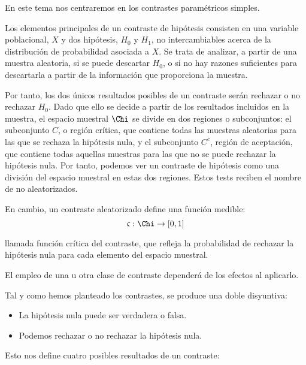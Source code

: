 En este tema nos centraremos en los contrastes param\'etricos simples.


Los elementos principales de un contraste de hip\'otesis consisten en una variable poblacional, $X$ y dos hip\'otesis, $H_0$ y $H_1$, no intercambiables acerca de la distribuci\'on de probabilidad asociada a $X$. Se trata de analizar, a partir de una muestra aleatoria, si se puede descartar $H_0$, o si no hay razones suficientes para descartarla a partir de la informaci\'on que proporciona la muestra.

Por tanto, los dos \'unicos resultados posibles de un contraste ser\'an rechazar o no rechazar $H_0$. Dado que ello se decide a partir de los resultados incluidos en la muestra, el espacio muestral $\Chi$ se divide en dos regiones o subconjuntos: el subconjunto $C$, o regi\'on cr\'itica, que contiene todas las muestras aleatorias para las que se rechaza la hip\'otesis nula, y el subconjunto $C^c$, regi\'on de aceptaci\'on, que contiene todas aquellas muestras para las que no se puede rechazar la hip\'otesis nula. Por tanto, podemos ver un contraste de hip\'otesis como una divisi\'on del espacio muestral en estas dos regiones. Estos tests reciben el nombre de no aleatorizados.

En cambio, un contraste aleatorizado define una funci\'on medible:
\begin{equation*}
\varsigma:\Chi\to[0,1]
\end{equation*}

llamada funci\'on cr\'itica del contraste, que refleja la probabilidad de rechazar la hip\'otesis nula para cada elemento del espacio muestral.

El empleo de una u otra clase de contraste depender\'a de los efectos al aplicarlo.


Tal y como hemos planteado los contrastes, se produce una doble disyuntiva:
\begin{itemize}
\item La hip\'otesis nula puede ser verdadera o falsa.
\item Podemos rechazar o no rechazar la hip\'otesis nula.
\end{itemize}

Esto nos define cuatro posibles resultados de un contraste:

